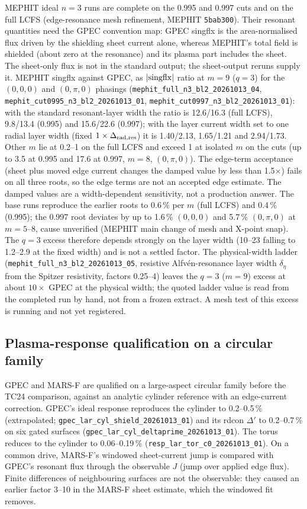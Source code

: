 MEPHIT ideal $n=3$ runs are complete on the 0.995 and 0.997 cuts and on the full LCFS
(edge-resonance mesh refinement, MEPHIT \texttt{5bab300}). Their resonant quantities
need the GPEC convention map: GPEC singflx is the area-normalised flux driven by the
shielding sheet current alone, whereas MEPHIT's total field is shielded (about zero at
the resonance) and its plasma part includes the sheet. The sheet-only flux is not in
the standard output; the sheet-output reruns supply it. MEPHIT singflx against GPEC, as $|{\rm singflx}|$ ratio at $m=9$ ($q=3$) for the
$(0,0,0)$ and $(0,\pi,0)$ phasings (\texttt{mephit\_full\_n3\_bl2\_20261013\_04},
\texttt{mephit\_cut0995\_n3\_bl2\_20261013\_01}, \texttt{mephit\_cut0997\_n3\_bl2\_20261013\_01}):
with the standard resonant-layer width the ratio is 12.6/16.3 (full LCFS), 9.8/13.4
(0.995) and 15.6/22.6 (0.997); with the layer current width set to one radial layer
width (fixed $1\times\Delta_{\rm rad,res}$) it is 1.40/2.13, 1.65/1.21 and 2.94/1.73. Other $m$ lie at 0.2--1 on the
full LCFS and exceed 1 at isolated $m$ on the cuts (up to 3.5 at 0.995 and 17.6 at 0.997,
$m=8$, $(0,\pi,0)$). The edge-term acceptance (sheet plus moved edge
current changes the damped value by less than 1.5$\times$) fails on all three roots, so
the edge terms are not an accepted edge estimate. The damped values are a
width-dependent sensitivity, not a production answer. The base runs reproduce the earlier
roots to 0.6\,\% per $m$ (full LCFS) and 0.4\,\% (0.995); the 0.997 root deviates by up to
1.6\,\% $(0,0,0)$ and 5.7\,\% $(0,\pi,0)$ at $m=5$--8, cause unverified (MEPHIT main change
of mesh and X-point snap). The $q=3$ excess therefore depends strongly on the layer width (10--23 falling to 1.2--2.9 at
the fixed width) and is not a settled factor. The physical-width ladder
(\texttt{mephit\_full\_n3\_bl2\_20261013\_05}, resistive Alfv\'en-resonance layer width
$\delta_\eta$ from the Spitzer resistivity, factors 0.25--4) leaves the $q=3$ ($m=9$) excess
at about $10\times$ GPEC at the physical width; the quoted ladder value is read from the
completed run by hand, not from a frozen extract. A mesh test of this excess is running
and not yet registered.

\subsection*{Plasma-response qualification on a circular family}
GPEC and MARS-F are qualified on a large-aspect circular family before the TC24 comparison,
against an analytic cylinder reference with an edge-current correction. GPEC's ideal
response reproduces the cylinder to 0.2--0.5\,\% (extrapolated;
\texttt{gpec\_lar\_cyl\_shield\_20261013\_01}) and its rdcon $\Delta'$ to 0.2--0.7\,\% on six gated
surfaces (\texttt{gpec\_lar\_cyl\_deltaprime\_20261013\_01}). The torus reduces to the cylinder to
0.06--0.19\,\% (\texttt{resp\_lar\_tor\_c0\_20261013\_01}). On a common drive, MARS-F's windowed
sheet-current jump is compared with GPEC's resonant flux through the observable $J$ (jump over
applied edge flux). Finite differences of neighbouring surfaces are not the observable: they caused an
earlier factor 3--10 in the MARS-F sheet estimate, which the windowed fit removes.

